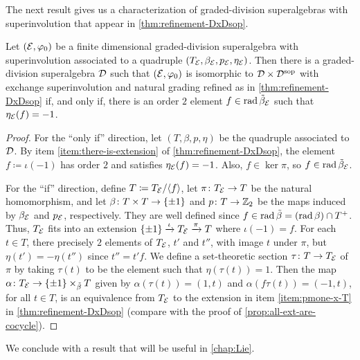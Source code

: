 The next result gives us a characterization of graded-division superalgebras with superinvolution that appear in \cref{thm:refinement-DxDsop}. 

\begin{prop}\label{lemma:undoubling-D}
    Let $(\mathcal E, \varphi_0)$ be a finite dimensional graded-division superalgebra with superinvolution associated to a quadruple $(T_{\mathcal E}, \beta_{\mathcal E}, p_{\mathcal E}, \eta_{\mathcal E})$. 
    Then there is a graded-division superalgebra $\mathcal{D}$ such that $(\mathcal E, \varphi_0)$ is isomorphic to $\mathcal{D} \times \mathcal{D}^{\mathrm{sop}}$ with exchange superinvolution and natural grading refined as in \cref{thm:refinement-DxDsop} if, and only if, there is an order $2$ element $f\in \operatorname{rad} \tilde\beta_{\mathcal E}$ such that $\eta_{\mathcal E}(f) = -1$. 
\end{prop}

\begin{proof}
    For the ``only if'' direction, let $(T, \beta, p, \eta)$ be the quadruple associated to $\mathcal{D}$. 
    By item \eqref{item:there-is-extension} of \cref{thm:refinement-DxDsop}, the element $f \coloneqq \iota(-1)$ has order $2$ and satisfies $\eta_{\mathcal E} (f) = -1$. 
    Also, $f \in \ker \pi$, so $f \in \operatorname{rad} \tilde\beta_{\mathcal E}$.
    
    For the ``if'' direction, define $T \coloneqq T_{\mathcal E} / \langle f \rangle$, let $\pi\colon T_{\mathcal E} \to T$ be the natural homomorphism, and let $\beta\colon T\times T \to \{ \pm 1 \}$ and $p\colon T \to \mathbb{Z}_2$ be the maps induced by $\beta_{\mathcal E}$ and $p_{\mathcal E}$, respectively. 
    They are well defined since $f\in \operatorname{rad} \tilde\beta = (\operatorname{rad} \beta) \cap T^+$. 
    Thus, $T_{\mathcal E}$ fits into an extension $\{ \pm 1 \} \xrightarrow{\iota}  T_{\mathcal E} \xrightarrow{\pi} T$ where $\iota (-1) = f$. 
    For each $t \in T$, there precisely $2$ elements of $T_{\mathcal E}$, $t'$ and $t''$, with image $t$ under $\pi$, but $\eta(t') = -\eta(t'')$ since $t'' = t'f$. 
    We define a set-theoretic section $\tau\colon T \to T_{\mathcal E}$ of $\pi$ by taking $\tau(t)$ to be the element such that $\eta(\tau(t)) = 1$. 
    Then the map $\alpha\colon T_{\mathcal E} \to \{ \pm 1 \} \times_{\tilde\beta} T$ given by $\alpha(\tau(t)) = (1, t)$ and $\alpha(f\tau(t)) = (-1, t)$, for all $t\in T$, is an equivalence from $T_{\mathcal E}$ to the extension in item \eqref{item:pmone-x-T} in \cref{thm:refinement-DxDsop} (compare with the proof of \cref{prop:all-ext-are-cocycle}). 
\end{proof}

We conclude with a result that will be useful in \cref{chap:Lie}. 

